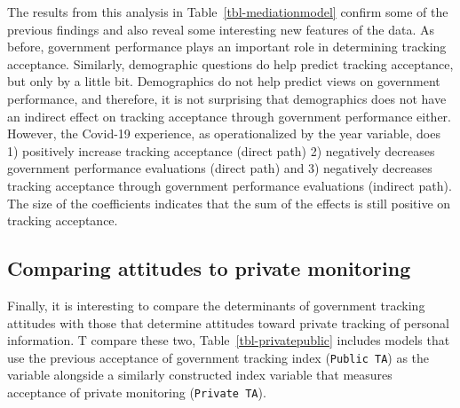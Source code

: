 \documentclass[
  letterpaper,
  DIV=11,
  numbers=noendperiod]{scrartcl}
\begin{document}
The results from this analysis in Table~\ref{tbl-mediationmodel} confirm
some of the previous findings and also reveal some interesting new
features of the data. As before, government performance plays an
important role in determining tracking acceptance. Similarly,
demographic questions do help predict tracking acceptance, but only by a
little bit. Demographics do not help predict views on government
performance, and therefore, it is not surprising that demographics does
not have an indirect effect on tracking acceptance through government
performance either. However, the Covid-19 experience, as operationalized
by the year variable, does 1) positively increase tracking acceptance
(direct path) 2) negatively decreases government performance evaluations
(direct path) and 3) negatively decreases tracking acceptance through
government performance evaluations (indirect path). The size of the
coefficients indicates that the sum of the effects is still positive on
tracking acceptance.

\subsection{Comparing attitudes to private
monitoring}\label{comparing-attitudes-to-private-monitoring}

Finally, it is interesting to compare the determinants of government
tracking attitudes with those that determine attitudes toward private
tracking of personal information. T compare these two,
Table~\ref{tbl-privatepublic} includes models that use the previous
acceptance of government tracking index (\texttt{Public\ TA}) as the
variable alongside a similarly constructed index variable that measures
acceptance of private monitoring (\texttt{Private\ TA}).
\end{document}
